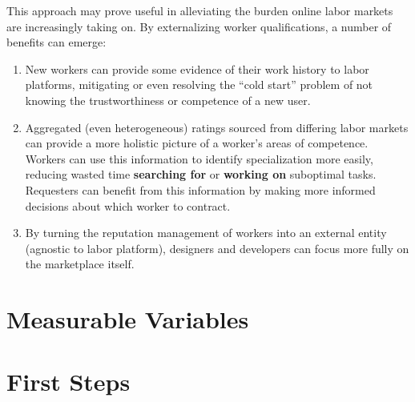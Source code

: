 \documentclass[11pt]{article}
\begin{document}
This approach may prove useful in
alleviating the burden online labor markets are increasingly taking on.
By externalizing worker qualifications, a number of benefits can emerge:
\begin{enumerate}
  \item New workers can provide some evidence of their work history to labor platforms,
        mitigating or even resolving the ``cold start'' problem of
        not knowing the trustworthiness or competence of a new user.
  \item Aggregated (even heterogeneous)
        ratings sourced from differing labor markets can provide
        a more holistic picture of a worker's areas of competence.
        Workers can use this information to identify specialization more easily,
        reducing wasted time \textbf{searching for} or \textbf{working on} suboptimal tasks.
        Requesters can benefit from this information by
        making more informed decisions about which worker to contract.
  \item By turning the reputation management of workers into an external entity
        (agnostic to labor platform),
        designers and developers can focus more fully on the marketplace itself.
\end{enumerate}


\section*{Measurable Variables}


\section*{First Steps}

\end{document}
